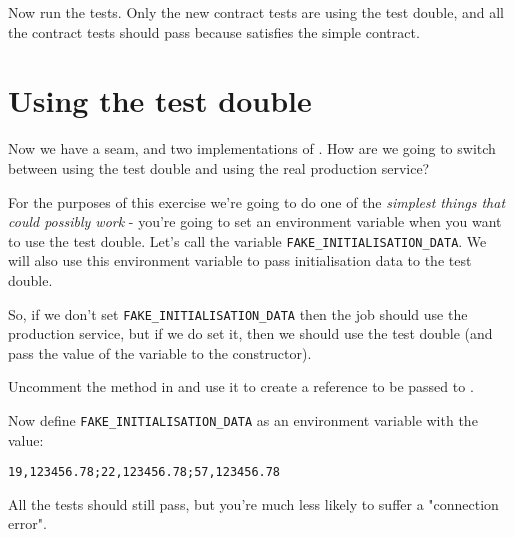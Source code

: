 Now run the tests. Only the new contract tests are using the test double, and all the contract tests should pass because \textvtt{\FakeRevenueProvider} satisfies the simple \textvtt{\RevenueProviderInterface} contract.

\section*{Using the test double}

Now we have a seam, and two implementations of \texttt{\RevenueProviderInterface}. How are we going to switch between using the test double and using the real production service? 


For the purposes of this exercise we're going to do one of the \emph{simplest things that could possibly work} - you're going to set an environment variable when you want \texttt{\ShoutyReportJob} to use the test double. Let's call the variable \texttt{FAKE_INITIALISATION_DATA}. We will also use this environment variable to pass initialisation data to the test double. 

So, if we don't set \texttt{FAKE_INITIALISATION_DATA} then the job should use the production service, but if we do set it, then we should use the test double (and pass the value of the variable to the \texttt{\FakeRevenueProvider} constructor).

\begin{sloppypar}
Uncomment the \texttt{\CreateRevenueProviderMethod} method in \texttt{\ShoutyReportJob} and use it to create a \texttt{\RevenueProviderInterface} reference to be passed to \texttt{\ShoutyReportProcessor}.
\end{sloppypar}

Now define \texttt{FAKE_INITIALISATION_DATA} as an environment variable with the value:

\hspace{2cm}\texttt{19,123456.78;22,123456.78;57,123456.78}

All the tests should still pass, but you're much less likely to suffer a "connection error".



